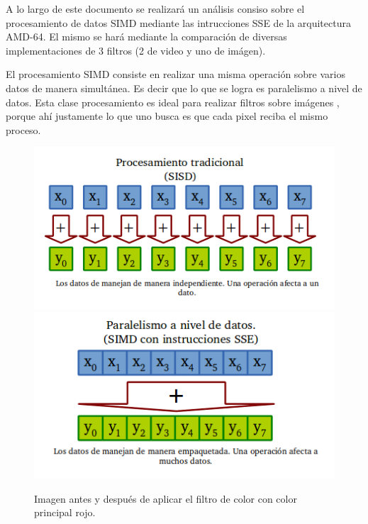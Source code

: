 

	A lo largo de este documento se realizará un análisis consiso sobre el
procesamiento de datos SIMD mediante las intrucciones SSE de la arquitectura
AMD-64. El mismo se hará mediante la comparación de diversas implementaciones
de 3 filtros (2 de video y uno de imágen).

	El procesamiento SIMD consiste en realizar una misma operación sobre varios
datos de manera simultánea. Es decir que lo que se logra es paralelismo a nivel
de datos. Esta clase procesamiento es ideal para realizar filtros sobre imágenes
, porque ahí justamente lo que uno busca es que cada pixel reciba el mismo proceso.


\begin{figure}[h]
\begin{center}
  \includegraphics[scale=0.4]{secciones/introduccion/imagenes/SISD.png}
    \includegraphics[scale=0.4]{secciones/introduccion/imagenes/SIMD.png}
\end{center}
\caption{Imagen antes y después de aplicar el filtro de color con color principal rojo.}
\label{fig:filtro-color-ejemplo}
\end{figure}


